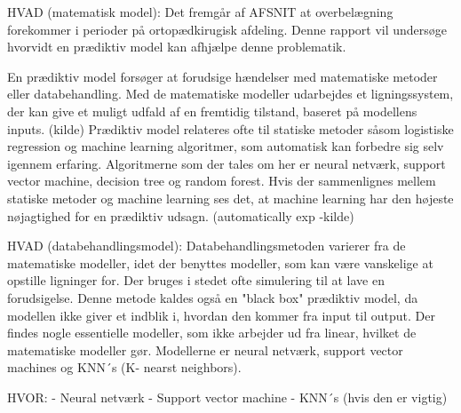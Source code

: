 %
HVAD (matematisk model):
Det fremgår af AFSNIT at overbelægning forekommer i perioder på ortopædkirugisk afdeling. Denne rapport vil undersøge hvorvidt en prædiktiv model kan afhjælpe denne problematik. 

En prædiktiv model forsøger at forudsige hændelser med matematiske metoder eller databehandling. Med de matematiske modeller udarbejdes et ligningssystem, der kan give et muligt udfald af en fremtidig tilstand, baseret på modellens inputs. (kilde) Prædiktiv model relateres ofte til statiske metoder såsom logistiske regression og machine learning algoritmer, som automatisk kan forbedre sig selv igennem erfaring. Algoritmerne som der tales om her er neural netværk, support vector machine, decision tree og random forest. Hvis der sammenlignes mellem statiske metoder og machine learning ses det, at machine learning har den højeste nøjagtighed for en prædiktiv udsagn. (automatically exp -kilde) 





HVAD (databehandlingsmodel):
Databehandlingsmetoden varierer fra de matematiske modeller, idet der benyttes modeller, som kan være vanskelige at opstille ligninger for. Der bruges i stedet ofte simulering til at lave en forudsigelse. Denne metode kaldes også en "black box" prædiktiv model, da modellen ikke giver et indblik i, hvordan den kommer fra input til output. Der findes nogle essentielle modeller, som ikke arbejder ud fra linear, hvilket de matematiske modeller gør. Modellerne er neural netværk, support vector machines og KNN´s (K- nearst neighbors).

HVOR: 
- Neural netværk
- Support vector machine 
- KNN´s (hvis den er vigtig)

